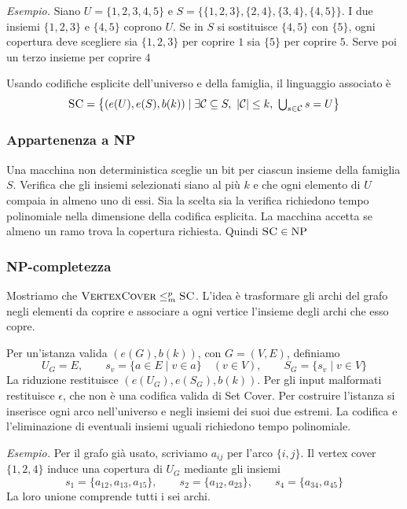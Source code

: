 \medskip
\noindent
\textit{Esempio.} Siano $U=\{1,2,3,4,5\}$ e
$S=\{\{1,2,3\},\{2,4\},\{3,4\},\{4,5\}\}$. I due insiemi
$\{1,2,3\}$ e $\{4,5\}$ coprono $U$. Se in $S$ si sostituisce
$\{4,5\}$ con $\{5\}$, ogni copertura deve scegliere sia
$\{1,2,3\}$ per coprire $1$ sia $\{5\}$ per coprire $5$.
Serve poi un terzo insieme per coprire $4$

\medskip
\noindent
Usando codifiche esplicite dell'universo e della famiglia,
il linguaggio associato è
\[
    \textsc{SC}
    =\bigl\{(e(U),e(S),b(k))\mid
        \exists\mathcal{C}\subseteq S,\
        |\mathcal{C}|\le k,\ \textstyle\bigcup_{s\in\mathcal C}s=U\bigr\}
\]

\subsubsection*{Appartenenza a NP}
Una macchina non deterministica sceglie un bit per ciascun
insieme della famiglia $S$. Verifica che gli insiemi
selezionati siano al più $k$ e che ogni elemento di $U$ compaia
in almeno uno di essi. Sia la scelta sia la verifica richiedono
tempo polinomiale nella dimensione della codifica esplicita.
La macchina accetta se almeno un ramo trova la copertura
richiesta. Quindi $\textsc{SC}\in\mathrm{NP}$

\subsubsection*{NP-completezza}
Mostriamo che $\textsc{VertexCover}\le_m^p\textsc{SC}$. L'idea
è trasformare gli archi del grafo negli elementi da coprire e
associare a ogni vertice l'insieme degli archi che esso copre.

\medskip
\noindent
Per un'istanza valida $(e(G),b(k))$, con $G=(V,E)$, definiamo
\[
    U_G=E,\qquad
    s_v=\{a\in E\mid v\in a\}\quad(v\in V),\qquad
    S_G=\{s_v\mid v\in V\}
\]
La riduzione restituisce $(e(U_G),e(S_G),b(k))$. Per gli input
malformati restituisce $\epsilon$, che non è una codifica valida
di Set Cover. Per costruire l'istanza si inserisce ogni arco
nell'universo e negli insiemi dei suoi due estremi. La codifica
e l'eliminazione di eventuali insiemi uguali richiedono tempo
polinomiale.

\medskip
\noindent
\textit{Esempio.} Per il grafo già usato, scriviamo $a_{ij}$
per l'arco $\{i,j\}$. Il vertex cover $\{1,2,4\}$ induce
una copertura di $U_G$ mediante gli insiemi
\[
    s_1=\{a_{12},a_{13},a_{15}\},\qquad
    s_2=\{a_{12},a_{23}\},\qquad
    s_4=\{a_{34},a_{45}\}
\]
La loro unione comprende tutti i sei archi.

